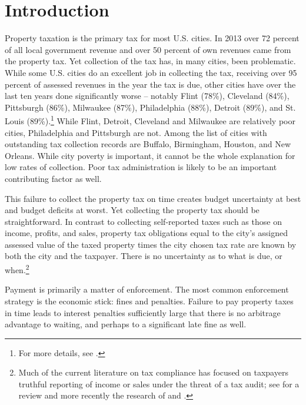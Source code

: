 \documentclass[12pt]{article}
\begin{document}
\newpage

\section{Introduction}

Property taxation is the primary tax for most U.S. cities.  In 2013
over 72 percent of all local government revenue and over 50 percent of
own revenues came from the property tax.  Yet collection of the tax
has, in many cities, been problematic.  While some U.S. cities do an
excellent job in collecting the tax, receiving over 95 percent of
assessed revenues in the year the tax is due, other cities have over
the last ten years done significantly worse -- notably Flint (78\%),
Cleveland (84\%), Pittsburgh (86\%), Milwaukee (87\%), Philadelphia
(88\%), Detroit (89\%), and St. Louis (89\%).\footnote{For more
  details, see .}  While Flint, Detroit, Cleveland and
Milwaukee are relatively poor cities, Philadelphia and Pittsburgh are
not.  Among the list of cities with outstanding tax collection records
are Buffalo, Birmingham, Houston, and New Orleans.  While city poverty
is important, it cannot be the whole explanation for low rates of
collection.  Poor tax administration is likely to be an important
contributing factor as well.

This failure to collect the property tax on time creates
budget uncertainty at best and budget deficits at worst.  Yet
collecting the property tax should be straightforward.  In contrast to
collecting self-reported taxes such as those on income, profits, and
sales, property tax obligations equal to the city's assigned assessed
value of the taxed property times the city chosen tax rate are known
by both the city and the taxpayer.  There is no uncertainty as to what
is due, or when.\footnote{Much of the current literature on tax
  compliance has focused on taxpayers truthful reporting of income or
  sales under the threat of a tax audit; see  for a
  review and more recently the research of  and
  .}

Payment is primarily  a matter of enforcement.  The most common
enforcement strategy is the economic stick: fines and penalties.
Failure to pay property taxes in time leads to interest penalties
sufficiently large that there is no arbitrage advantage to waiting,
and perhaps to a significant late fine as well.  
\end{document}
